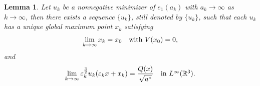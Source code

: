 \documentclass[reqno, 11pt]{amsart} %
\numberwithin{equation}{section}
\newtheorem{lemma}[theorem]{Lemma}
\begin{document}
	\begin{lemma}\label{lem3-3}
		Let $u_{k}$ be a nonnegative minimizer of $e_{1}(a_{k})$ with $a_{k}\rightarrow \infty$ as $k\rightarrow\infty$, then there exists a sequence $\{u_{k}\}$, still denoted by  $\{u_{k}\}$, such that each $u_{k}$ has a unique global maximum point $x_{k}$ satisfying
		\begin{equation}\label{equ3-27}
			\lim\limits_{k\rightarrow \infty} x_{k} =x_{0}\quad\hbox{with $V(x_{0})=0$},
		\end{equation}
		and
		\begin{equation}\label{equ3-28}
			\lim\limits_{k\rightarrow \infty} \varepsilon_{k}^{\frac{3}{2}}u_{k}(\varepsilon_{k}x+x_{k}) =\frac{Q(x)}{\sqrt{a^{\ast}}} \quad\hbox{in $L^{\infty}(\mathbb{R}^{3})$}.
		\end{equation}
	\end{lemma}
\end{document}
